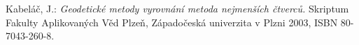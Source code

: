 \begin{thebibliography}{99}

 Kabeláč, J.: {\it Geodetické metody vyrovnání
metoda nejmenších čtverců.} Skriptum Fakulty Aplikovaných Věd Plzeň, 
Západočeská univerzita v Plzni 2003, ISBN 80-7043-260-8.


\end{thebibliography}
